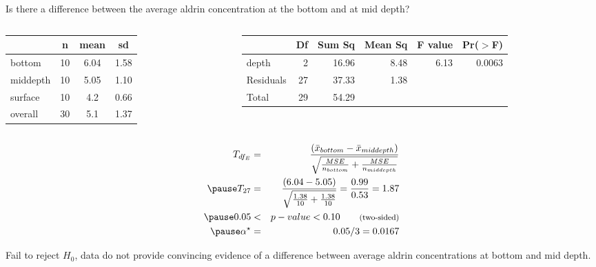 \documentclass[
  ignorenonframetext,
]{beamer}
\begin{document}
\begin{frame}{}
\protect\hypertarget{section-1}{}
\alert{Is there a difference between the average aldrin concentration at the bottom and at mid depth?}

\begin{columns}

\begin{column}{0.4\textwidth}
\scriptsize
\begin{center}
\begin{tabular}{l | c c c}
        & n & mean  & sd        \\
\hline
bottom  & 10    & \alert{6.04}  & 1.58 \\
middepth& 10    & \alert{5.05}  & 1.10 \\
surface & 10    & 4.2   & 0.66 \\
\hline
overall & 30    & 5.1       & 1.37
\end{tabular}
\end{center}
\end{column}

\begin{column}{0.7\textwidth}
\scriptsize
\begin{center}
\begin{tabular}{l rrrrr}
\hline
            & Df    & Sum Sq    & Mean Sq   & F value   & Pr($>$F) \\ 
\hline
depth       & 2     & 16.96     & 8.48      & 6.13  & 0.0063 \\ 
Residuals   & \alert{27}    & 37.33     & \alert{1.38}      &       &  \\ 
\hline
Total           & 29    & 54.29 \\
\end{tabular}
\end{center}
\end{column}

\end{columns}

\begin{eqnarray*}
T_{df_E} &=& \frac{(\bar{x}_{bottom} - \bar{x}_{middepth})}{\sqrt{ \frac{MSE}{n_{bottom}} + \frac{MSE}{n_{middepth}} }} \\ 
\pause
T_{27} &=& \frac{( 6.04 - 5.05 )}{\sqrt{ \frac{1.38}{10} + \frac{1.38}{10} }} = \frac{0.99}{0.53}  =1.87 \\
\pause
0.05 &<& p-value < 0.10 \qquad \text{{\footnotesize (two-sided)}} \\
\pause
\alpha^\star &=& 0.05 / 3 = 0.0167
\end{eqnarray*}

\pause

\small Fail to reject \(H_0\), data do not provide convincing evidence
of a difference between average aldrin concentrations at bottom and mid
depth.
\end{frame}
\end{document}
